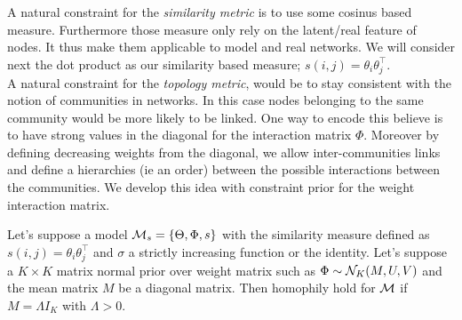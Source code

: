 A natural constraint for the \emph{similarity metric} is to use some cosinus based measure. Furthermore those measure only rely on the latent/real feature of nodes. It thus make them applicable to model and real networks. We will consider next the dot product as our similarity based measure; $s(i,j) = \theta_i \theta_j^\top$.~\\

A natural constraint for the \emph{topology metric}, would be to stay consistent with the notion of communities in networks. In this case nodes belonging to the same community would be more likely to be linked. One way to encode this believe is to have strong values in the diagonal for the interaction matrix $\Phi$. Moreover by defining decreasing weights from the diagonal, we allow inter-communities links and define a hierarchies (ie an order) between the possible interactions between the communities. We develop this idea with constraint prior for the weight interaction matrix.


\begin{proposition}[] \label{prop:hom_mn}
Let's suppose a model $ \mathcal{M}_s=\{\Theta, \Phi, s\}$ with the similarity measure defined as $s(i,j) = \theta_i \theta_j^\top$ and $\sigma$ a strictly increasing function or the identity. Let's suppose a $K\times K$ matrix normal prior over weight matrix such as $\Phi \sim \mathcal{N}_K(M, U, V)$ and the mean matrix $M$ be a diagonal matrix. Then homophily hold for $\mathcal{M}$ if $M=\Lambda I_K$ with $\Lambda > 0$.
\end{proposition}

